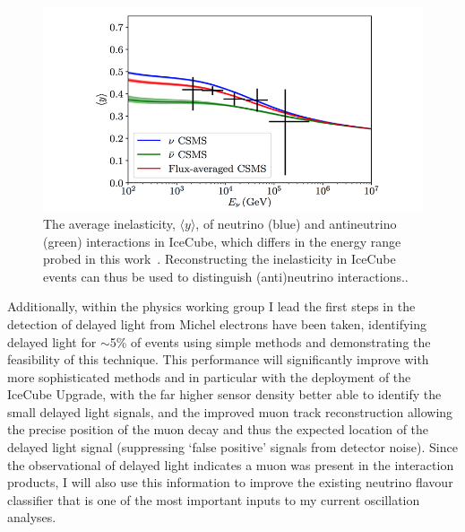 \documentclass[a4paper,11pt]{article}
\begin{document}
\begin{figure} %
    \centering
    \includegraphics[trim=2.0cm 0.0cm 1.0cm 0.0cm, clip=true, width=\linewidth]{images/inelasticity.png}
    \caption{The average inelasticity, $\langle y \rangle$, of neutrino (blue) and antineutrino (green) interactions in IceCube, which differs in the energy range probed in this work~\cite{Aartsen:2018vez}. Reconstructing the inelasticity in IceCube events can thus be used to distinguish (anti)neutrino interactions..}
    \label{fig:inelasticity}
\end{figure}

Additionally, within the physics working group I lead the first steps in the detection of delayed light from Michel electrons have been taken, identifying delayed light for $\sim$5\% of events using simple methods and demonstrating the feasibility of this technique. This performance will significantly improve with more sophisticated methods and in particular with the deployment of the IceCube Upgrade, with the far higher sensor density better able to identify the small delayed light signals, and the improved muon track reconstruction allowing the precise position of the muon decay and thus the expected location of the delayed light signal (suppressing `false positive' signals from detector noise). Since the observational of delayed light indicates a muon was present in the interaction products, I will also use this information to improve the existing neutrino flavour classifier that is one of the most important inputs to my current oscillation analyses. 
\end{document}
